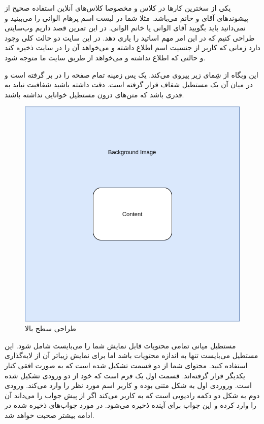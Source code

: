\documentclass[../main.tex]{subfiles}
\begin{document}

یکی از سخترین کارها در کلاس و مخصوصا کلاس‌های آنلاین استفاده صحیح از پیشوندهای آقای و خانم می‌باشد.
مثلا شما در لیست اسم پرهام الوانی را می‌بینید و نمی‌دانید باید بگویید آقای الوانی یا خانم الوانی.
در این تمرین قصد داریم وب‌سایتی طراحی کنیم که در این امر مهم اساتید را یاری دهد.
در این سایت دو حالت کلی وچود دارد زمانی که کاربر از جنسیت اسم اطلاع داشته و می‌خواهد آن را در سایت ذخیره کند و حالتی که اطلاع نداشته و می‌خواهد از طریق سایت ما متوجه شود.

این وبگاه از شِمای زیر پیروی می‌کند. یک پس زمینه تمام صفحه را در بر گرفته است و در میان آن یک مستطیل شفاف قرار گرفته است.
دقت داشته باشید شفافیت نباید به قدری باشد که متن‌های درون مستطیل خوانایی نداشته باشند.

\begin{figure}[h]
  \centering
  \includegraphics[scale=0.25]{./genderize-top-level}
  \caption{طراحی سطح بالا}
\end{figure}

مستطیل میانی تمامی محتویات قابل نمایش شما را می‌بایست شامل شود. این مستطیل می‌بایست تنها به اندازه محتویات باشد اما برای نمایش زیباتر آن از لایه‌گذاری استفاده کنید.
محتوای شما از دو قسمت تشکیل شده است که به صورت افقی کنار یکدیگر قرار گرفته‌اند. قسمت اول یک فرم است که خود از دو ورودی تشکیل شده است. وروردی اول به شکل متنی بوده و کاربر اسم مورد نظر را وارد می‌کند.
ورودی دوم به شکل دو دکمه رادیویی است که به کاربر می‌کند اگر از پیش جواب را می‌داند آن را وارد کرده و این جواب برای آینده ذخیره می‌شود. در مورد جواب‌های ذخیره شده در ادامه بیشتر صحبت خواهد شد.
\end{document}
